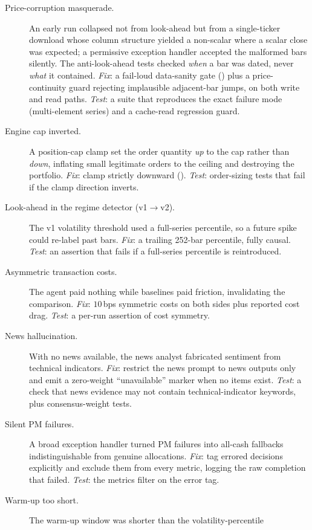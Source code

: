 \begin{description}
  \item[Price-corruption masquerade.] An early run collapsed not from look-ahead but from a
  single-ticker download whose column structure yielded a non-scalar where a scalar close was
  expected; a permissive exception handler accepted the malformed bars silently. The
  anti-look-ahead tests checked \emph{when} a bar was dated, never \emph{what} it contained.
  \emph{Fix}: a fail-loud data-sanity gate () plus a price-continuity
  guard rejecting implausible adjacent-bar jumps, on both write and read paths. \emph{Test}:
  a suite that reproduces the exact failure mode (multi-element series) and a cache-read
  regression guard.
  \item[Engine cap inverted.] A position-cap clamp set the order quantity \emph{up} to the
  cap rather than \emph{down}, inflating small legitimate orders to the ceiling and destroying
  the portfolio. \emph{Fix}: clamp strictly downward ().
  \emph{Test}: order-sizing tests that fail if the clamp direction inverts.
  \item[Look-ahead in the regime detector (v1$\rightarrow$v2).] The v1 volatility threshold
  used a full-series percentile, so a future spike could re-label past bars. \emph{Fix}: a
  trailing 252-bar percentile, fully causal. \emph{Test}: an assertion that fails if a
  full-series percentile is reintroduced.
  \item[Asymmetric transaction costs.] The agent paid nothing while baselines paid friction,
  invalidating the comparison. \emph{Fix}: $10$\,bps symmetric costs on both sides plus
  reported cost drag. \emph{Test}: a per-run assertion of cost symmetry.
  \item[News hallucination.] With no news available, the news analyst fabricated sentiment
  from technical indicators. \emph{Fix}: restrict the news prompt to news outputs only and
  emit a zero-weight ``unavailable'' marker when no items exist. \emph{Test}: a check that
  news evidence may not contain technical-indicator keywords, plus consensus-weight tests.
  \item[Silent PM failures.] A broad exception handler turned PM failures into all-cash
  fallbacks indistinguishable from genuine allocations. \emph{Fix}: tag errored decisions
  explicitly and exclude them from every metric, logging the raw completion that failed.
  \emph{Test}: the metrics filter on the error tag.
  \item[Warm-up too short.] The warm-up window was shorter than the volatility-percentile

\end{description}
